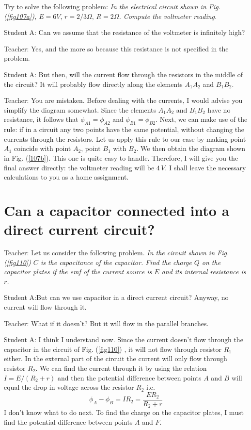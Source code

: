 \documentclass[a4paper,12pt]{book}
\begin{document}
Try to solve the following problem: \emph{In the electrical circuit shown in Fig. (\ref{fig107a}), $E= 6 V, \, r =2/3 \Omega, \, R = 2 \Omega$. Compute the voltmeter reading. } 

{\sc Student A:} Can we assume that the resistance of the voltmeter is infinitely high?

{\sc Teacher:} Yes, and the more so because this resistance is not specified in the problem.

{\sc Student A:} But then, will the current flow through the resistors in the middle of the circuit? It will probably flow directly along the elements $A_{1}A_{2}$ and $B_{1}B_{2}$.

{\sc Teacher:} You are mistaken. Before dealing with the currents, I would advise you simplify the diagram somewhat. Since the elements $A_{1}A_{2}$ and $B_{1}B_{2}$ have no resistance, it follows that $\phi_{A1} = \phi_{A2}$ and $\phi_{B1} = \phi_{B2}$. Next, we can make use of the rule: if in a circuit any two points have the same potential, without changing the currents through the resistors. Let us apply this rule to our case by making point $A_{1}$ coincide with point $A_{2}$, point $B_{1}$ with $B_{2}$. We then obtain the diagram shown in Fig. (\ref{107b}). This one is quite easy to handle. Therefore, I will give you the final answer directly: the voltmeter reading will be $4 \,V$. I shall leave the necessary calculations to you as a home assignment.

\section{Can a capacitor connected into a direct current circuit?}

{\sc Teacher:} Let us consider the following problem. \emph{In the circuit shown in Fig. (\ref{fig110}) $C$ is the capacitance of the capacitor. Find the charge $Q$ on the capacitor plates if the emf of the current source is $E$ and its internal resistance is $r$.}

{\sc Student A:}But can we use capacitor in a direct current circuit? Anyway, no current will flow through it.

{\sc Teacher:} What if it doesn't? But it will flow in the parallel branches.

{\sc Student A:} I think I understand now. Since the current doesn't flow through the capacitor in the circuit of Fig. (\ref{fig110}) , it will not flow through resistor $R_{1}$ either. In the external part of the circuit the current will only flow through resistor $R_{2}$. We can find the current through it by using the relation $I = E / (R_{2} + r)$ and then the potential difference between points $A$ and $B$ will equal the drop in voltage across the resistor $R_{2}$ i.e. 
 \begin{equation}
 \phi_{A} - \phi_{B} = IR_{2} = \frac{ER_{2}}{R_{2}+ r}
\end{equation}
I don't know what to do next. To find the charge on the capacitor plates, I must find the potential difference between points $A$ and $F$.
\end{document}
